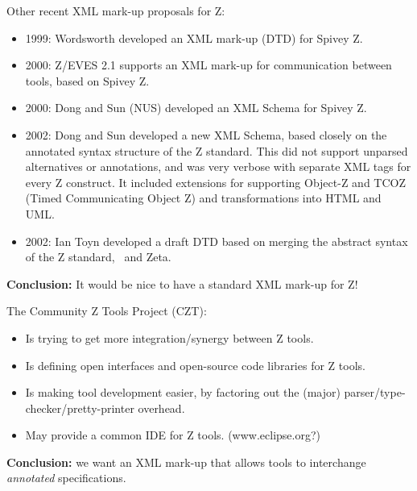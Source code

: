 \documentclass[%
   slidesonly,%
   semhelv,%
   landscape]{seminar}
\newcommand{\Zeta}{Zeta}
\begin{document}
\begin{slide}
  Other recent XML mark-up proposals for Z:
\begin{itemize}
  \item 1999: Wordsworth developed an XML mark-up (DTD) for Spivey Z.
  \item 2000: Z/EVES 2.1 supports an XML mark-up for communication between 
    tools, based on Spivey Z.
  \item 2000: Dong and Sun (NUS) developed an XML Schema for Spivey Z. 
  \item 2002: Dong and Sun developed a new XML Schema, based closely on
    the annotated syntax structure of the Z standard.  This did not
    support unparsed alternatives or annotations, and was very verbose
    with separate XML tags for every Z construct.  
    It included extensions for supporting Object-Z and TCOZ (Timed
    Communicating Object Z) and transformations into HTML and UML.
  \item 2002: Ian Toyn developed a draft DTD based on merging
    the abstract syntax of the Z standard, \CADiZ\ and \Zeta.
\end{itemize}

\textbf{Conclusion:} It would be nice to have a standard XML mark-up for Z!
\end{slide}


\begin{slide}
The Community Z Tools Project (CZT):
\begin{itemize}
\item Is trying to get more integration/synergy between Z tools.
\item Is defining open interfaces and open-source code libraries
  for Z tools.
\item Is making tool development easier, by factoring out the (major)
  parser/type-checker/pretty-printer overhead.
\item May provide a common IDE for Z tools.  (www.eclipse.org?)
\end{itemize}

\textbf{Conclusion:} we want an XML mark-up that allows tools to 
interchange \emph{annotated} specifications. 
\end{slide}
\end{document}
